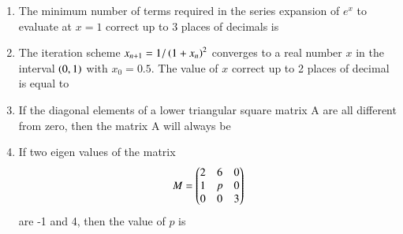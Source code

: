 \documentclass[journal,,12pt,onecolumn]{IEEEtran}
\theoremstyle{remark}
\begin{document}
\begin{enumerate}
    \item The minimum number of terms required in the series expansion of $e^x$ to evaluate at $x=1$ correct up to 3 places of decimals is
    \begin{enumerate}
    \end{enumerate}
    \bigskip
\item The iteration scheme $x_{n+1}=1/\left(1+x_n\right)^2$ converges to a real number $x$ in the interval $\left(0,1\right)$ with $x_0=0.5$. The value of $x$ correct up to 2 places of decimal is equal to
\begin{enumerate}
\end{enumerate}
\bigskip
\item If the diagonal elements of a lower triangular square matrix A are all different from zero, then the matrix A will always be
\begin{enumerate}
\end{enumerate}
\bigskip
\item If two eigen values of the matrix
\begin{align*}
    M=\begin{pmatrix}2&6&0\\1&p&0\\0&0&3\end{pmatrix}
\end{align*}
are -1 and 4, then the value of $p$ is
\begin{enumerate}
    \begin{multicols}{4}

\end{multicols}
\end{enumerate}
\end{enumerate}
\end{document}
